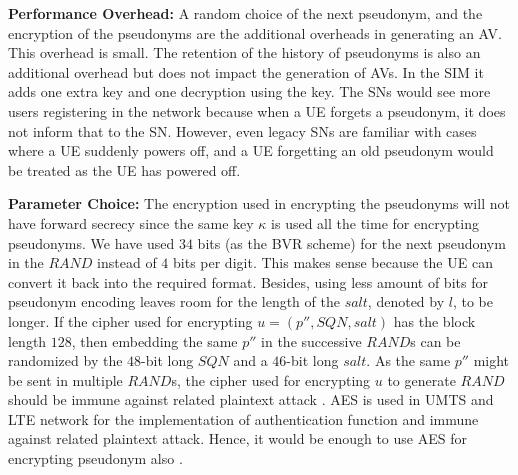 \documentclass{llncs} %
\begin{document}

\textbf{Performance Overhead:} A random choice of the next pseudonym, and the encryption of the pseudonyms are the additional overheads in generating an AV. This overhead is small. The retention of the history of pseudonyms is also an additional overhead but does not impact the generation of AVs. In the SIM it adds one extra key and one decryption using the key. The SNs would see more users registering in the network because when a UE forgets a pseudonym, it does not inform that to the SN. However, even legacy SNs are familiar with cases where a UE suddenly powers off, and a UE forgetting an old pseudonym would be treated as the UE has powered off.

\textbf{Parameter Choice:} The encryption used in encrypting the pseudonyms will not have forward secrecy since the same key $\kappa$ is used all the time for encrypting pseudonyms. We have used $34$ bits (as the BVR scheme) for the next pseudonym in the $RAND$ instead of $4$ bits per digit. This makes sense because the UE can convert it back into the required format. Besides, using less amount of bits for pseudonym encoding leaves room for the length of the $salt$, denoted by $l$, to be longer. If the cipher used for encrypting $u=\left(p'',SQN,salt\right)$ has the block length $128$, then embedding the same $p''$ in the successive $RAND$s can be randomized by the $48$-bit long $SQN$ and a $46$-bit long $salt$. As the same $p''$ might be sent in multiple $RAND$s, the cipher used for encrypting $u$ to generate $RAND$ should be immune against related plaintext attack \cite{CCS15}. AES is used in UMTS and LTE network for the implementation of authentication function and immune against related plaintext attack. Hence, it would be enough to use AES for encrypting pseudonym also \cite{CCS15}. 
\end{document}
